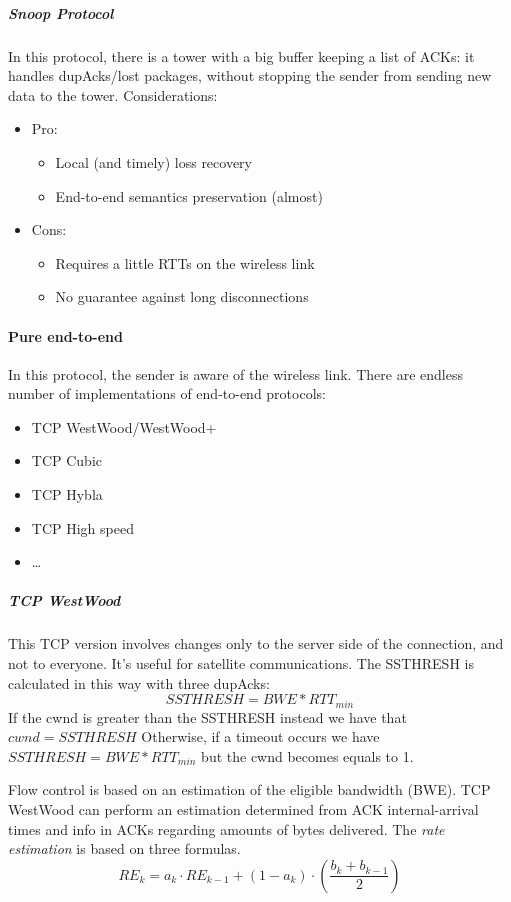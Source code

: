 \subparagraph*{Snoop Protocol} In this protocol, there is a tower with a big
buffer keeping a list of ACKs: it handles dupAcks/lost packages, without
stopping the sender from sending new data to the tower.
Considerations:
\begin{itemize}
\item Pro:
  \begin{itemize}
  \item Local (and timely) loss recovery
  \item End-to-end semantics preservation (almost)
  \end{itemize}
\item Cons:
  \begin{itemize}
  \item Requires a little RTTs on the wireless link
  \item No guarantee against long disconnections
  \end{itemize}
\end{itemize}

\paragraph*{Pure end-to-end} In this protocol, the sender is aware of the wireless
link. There are endless number of implementations of end-to-end protocols:
\begin{itemize}
\item TCP WestWood/WestWood+
\item TCP Cubic
\item TCP Hybla
\item TCP High speed
\item \dots
\end{itemize}

\subparagraph*{TCP WestWood} This TCP version involves changes only to the
server side of the connection, and not to everyone. It's useful for satellite
communications.
The SSTHRESH is calculated in this way with three dupAcks:
\begin{equation}
SSTHRESH = BWE * RTT_{min}
\end{equation}
If the cwnd is greater than the SSTHRESH instead we have that $cwnd=SSTHRESH$
Otherwise, if a timeout occurs we have $SSTHRESH = BWE * RTT_{min}$ but the
cwnd becomes equals to 1.

Flow control is based on an estimation of the eligible bandwidth (BWE). TCP
WestWood can perform an estimation determined from ACK internal-arrival times
and info in ACKs regarding amounts of bytes delivered. The \textit{rate
  estimation} is based on three formulas.
\begin{equation}
  RE_k = a_k \cdot RE_{k-1} + (1 - a_k) \cdot \left( \frac{b_k + b_{k-1}}{2}
\right)
\end{equation}

